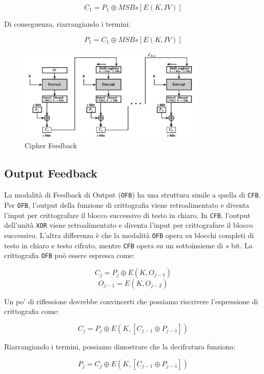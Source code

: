 \[ C_1 = P_1 \oplus MSBs[E(K, IV)] \]

Di conseguenza, riarrangiando i termini:

\[ P_1 = C_1 \oplus MSBs[E(K, IV)] \]
\begin{figure}[H]
    \centering
    \includegraphics[width=0.8\textwidth]{img/cipherFeedback.png}
    \caption{Cipher Feedback}
\end{figure}
\subsection{Output Feedback}
La modalità di Feedback di Output (\verb|OFB|) ha una struttura simile a
quella di \verb|CFB|. Per \verb|OFB|, l'output della funzione di crittografia viene
retroalimentato e diventa l'input per crittografare il blocco successivo
di testo in chiaro. In \verb|CFB|, l'output dell'unità \verb|XOR| viene
retroalimentato e diventa l'input per crittografare il blocco successivo.
L'altra differenza è che la modalità \verb|OFB| opera su blocchi completi
di testo
in chiaro e testo cifrato, mentre \verb|CFB| opera su un sottoinsieme di \(s\) bit.
La crittografia \verb|OFB| può essere espressa come:

\[ C_j = P_j \oplus E(K, O_{j-1}) \]
\[ O_{j-1} = E(K, O_{j-2}) \]

Un po' di riflessione dovrebbe convincerti che possiamo riscrivere
l'espressione di crittografia come:

\[ C_j = P_j \oplus E(K, [C_{j-1} \oplus P_{j-1}]) \]

Riarrangiando i termini, possiamo dimostrare che la decifratura funziona:

\[ P_j = C_j \oplus E(K, [C_{j-1} \oplus P_{j-1}]) \]

